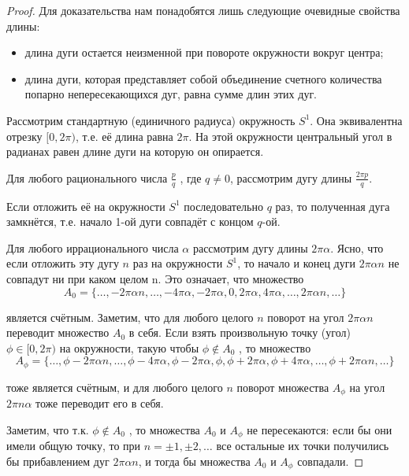 \begin{proof}
Для доказательства нам понадобятся лишь следующие очевидные свойства длины:

\begin{itemize}
\item длина дуги остается неизменной при повороте окружности вокруг
центра;
\item длина дуги, которая представляет собой объединение счетного количества попарно непересекающихся дуг, равна сумме длин этих
дуг.	
\end{itemize}	

Рассмотрим стандартную (единичного радиуса) окружность $S^1$. Она эквивалентна отрезку $[0, 2\pi)$, т.е. её длина равна $2\pi$. На этой окружности центральный угол в радианах равен длине дуги на которую он опирается.

Для любого рационального числа $\frac{p}{q}$ , где $q\ne 0$, рассмотрим дугу длины $\frac{2\pi p}{q}$.

Если отложить её на окружности $S^1$ последовательно $q$ раз, то полученная дуга замкнётся, т.е. начало 1-ой дуги совпадёт с концом $q$-ой.

Для любого иррационального числа $\alpha$ рассмотрим дугу длины $2\pi\alpha$. Ясно, что если отложить эту дугу $n$ раз на окружности $S^1$, то начало и конец дуги $2\pi\alpha n$ не совпадут ни при каком целом n. Это означает, что множество
\begin{equation*}
	A_0 = \{\ldots, -2\pi\alpha n, \ldots , -4\pi\alpha, -2\pi\alpha, 0, 2\pi\alpha, 4\pi\alpha, \ldots , 2\pi\alpha n, \ldots\}
\end{equation*}

является счётным. Заметим, что для любого целого $n$ поворот на угол $2\pi\alpha n$ переводит множество $A_0$ в себя.
Если взять произвольную точку (угол) $\phi \in [0, 2\pi)$ на окружности, такую чтобы $\phi \notin A_0$ , то множество
\begin{equation*}
	A_\phi = \{\ldots , \phi - 2\pi\alpha n, \ldots , \phi - 4\pi\alpha, \phi - 2\pi\alpha, \phi, \phi + 2\pi\alpha, \phi + 4\pi\alpha, \ldots , \phi + 2\pi\alpha n, \ldots \}
\end{equation*}

тоже является счётным, и для любого целого $n$ поворот множества $A_\phi$ на угол $2\pi n\alpha$ тоже переводит его в себя. 

Заметим, что т.к. $\phi \notin A_0$ , то множества $A_0$
и $A_\phi$ не пересекаются: если бы они имели общую точку, то при $n=\pm1, \pm2, \ldots$ все остальные их точки получились бы прибавлением дуг $2\pi\alpha n$, и тогда бы множества $A_0$ и $A_\phi$ совпадали. 


\end{proof}
